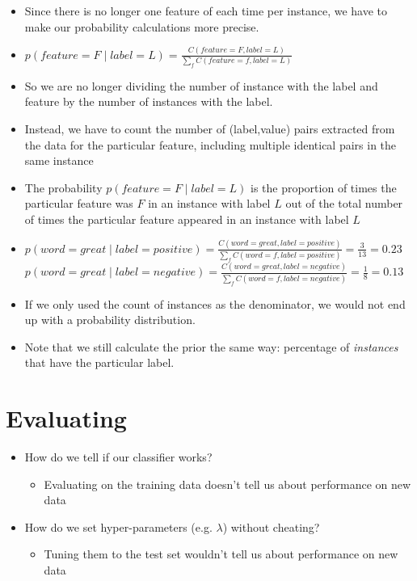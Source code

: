 \documentclass[11pt,letterpaper]{article}
\begin{document}
\begin{itemize}
  \item Since there is no longer one feature of each time per instance, we have to make our probability calculations more precise.
  \item $p(feature=F \mid label=L) = \frac{C(feature=F,label=L)}{\sum_f C(feature=f,label=L)}$
  \item So we are no longer dividing the number of instance with the label and feature by the number of instances with the label.
  \item Instead, we have to count the number of (label,value) pairs extracted from the data for the particular feature, including multiple identical pairs in the same instance
  \item The probability $p(feature=F \mid label=L)$ is the proportion of times the particular feature was $F$ in an instance with label $L$ out of the total number of times the particular feature appeared in an instance with label $L$
  \item $p(word=great \mid label=positive) = \frac{C(word=great,label=positive)}{\sum_f C(word=f,label=positive)} = \frac{3}{13} = 0.23$ \\
  $p(word=great \mid label=negative) = \frac{C(word=great,label=negative)}{\sum_f C(word=f,label=negative)} = \frac{1}{8} = 0.13$
  \item If we only used the count of instances as the denominator, we would not end up with a probability distribution.
  \item Note that we still calculate the prior the same way: percentage of \textit{instances} that have the particular label.
\end{itemize}





\section{Evaluating}

\begin{itemize}
  \item How do we tell if our classifier works?
    \begin{itemize}
      \item Evaluating on the training data doesn't tell us about performance on new data
    \end{itemize}
  \item How do we set hyper-parameters (e.g. $\lambda$) without cheating?
    \begin{itemize}
      \item Tuning them to the test set wouldn't tell us about performance on new data
    \end{itemize}
\end{itemize}
\end{document}
